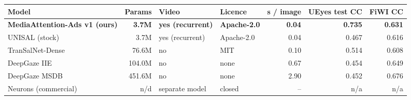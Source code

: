 \begin{tabular}{lrllrrr}
\toprule
Model & Params & Video & Licence & s / image & UEyes test CC & FiWI CC \\
\midrule
\textbf{MediaAttention-Ads v1 (ours)} & \textbf{3.7M} & \textbf{yes (recurrent)} & \textbf{Apache-2.0} & \textbf{0.04} & \textbf{0.735} & \textbf{0.631} \\
UNISAL (stock) & 3.7M & yes (recurrent) & Apache-2.0 & 0.04 & 0.467 & 0.616 \\
TranSalNet-Dense & 76.6M & no & MIT & 0.10 & 0.514 & 0.608 \\
DeepGaze IIE & 104.0M & no & none & 0.67 & 0.454 & 0.649 \\
DeepGaze MSDB & 451.6M & no & none & 2.90 & 0.452 & 0.676 \\
Neurons (commercial) & n/d & separate model & closed & -- & n/a & n/a \\
\bottomrule
\end{tabular}
